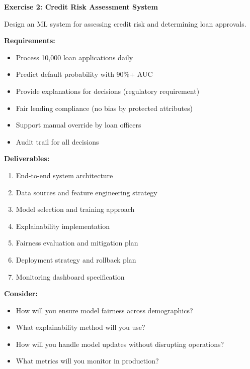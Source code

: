 \begin{exercise}
\textbf{Exercise 2: Credit Risk Assessment System}

Design an ML system for assessing credit risk and determining loan approvals.

\textbf{Requirements:}
\begin{itemize}
    \item Process 10,000 loan applications daily
    \item Predict default probability with 90\%+ AUC
    \item Provide explanations for decisions (regulatory requirement)
    \item Fair lending compliance (no bias by protected attributes)
    \item Support manual override by loan officers
    \item Audit trail for all decisions
\end{itemize}

\textbf{Deliverables:}
\begin{enumerate}
    \item End-to-end system architecture
    \item Data sources and feature engineering strategy
    \item Model selection and training approach
    \item Explainability implementation
    \item Fairness evaluation and mitigation plan
    \item Deployment strategy and rollback plan
    \item Monitoring dashboard specification
\end{enumerate}

\textbf{Consider:}
\begin{itemize}
    \item How will you ensure model fairness across demographics?
    \item What explainability method will you use?
    \item How will you handle model updates without disrupting operations?
    \item What metrics will you monitor in production?
\end{itemize}
\end{exercise}

